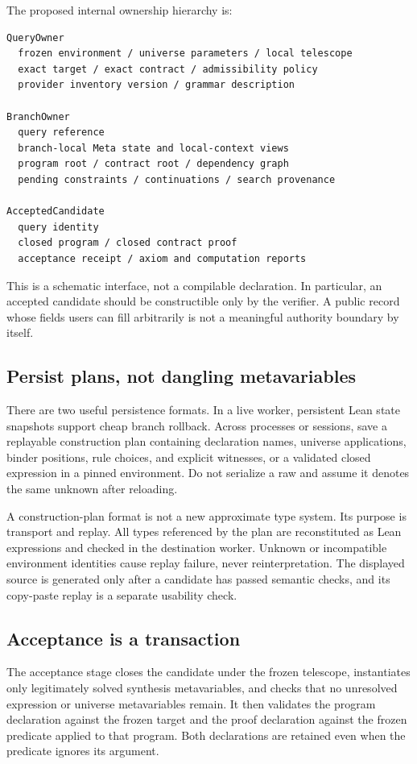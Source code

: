 The proposed internal ownership hierarchy is:
\begin{lstlisting}
QueryOwner
  frozen environment / universe parameters / local telescope
  exact target / exact contract / admissibility policy
  provider inventory version / grammar description

BranchOwner
  query reference
  branch-local Meta state and local-context views
  program root / contract root / dependency graph
  pending constraints / continuations / search provenance

AcceptedCandidate
  query identity
  closed program / closed contract proof
  acceptance receipt / axiom and computation reports
\end{lstlisting}
This is a schematic interface, not a compilable declaration. In particular, an accepted candidate should be constructible only by the verifier. A public record whose fields users can fill arbitrarily is not a meaningful authority boundary by itself.

\subsection{Persist plans, not dangling metavariables}
There are two useful persistence formats. In a live worker, persistent Lean state snapshots support cheap branch rollback. Across processes or sessions, save a replayable construction plan containing declaration names, universe applications, binder positions, rule choices, and explicit witnesses, or a validated closed expression in a pinned environment. Do not serialize a raw  and assume it denotes the same unknown after reloading.

A construction-plan format is not a new approximate type system. Its purpose is transport and replay. All types referenced by the plan are reconstituted as Lean expressions and checked in the destination worker. Unknown or incompatible environment identities cause replay failure, never reinterpretation. The displayed source is generated only after a candidate has passed semantic checks, and its copy-paste replay is a separate usability check.

\subsection{Acceptance is a transaction}
The acceptance stage closes the candidate under the frozen telescope, instantiates only legitimately solved synthesis metavariables, and checks that no unresolved expression or universe metavariables remain. It then validates the program declaration against the frozen target and the proof declaration against the frozen predicate applied to that program. Both declarations are retained even when the predicate ignores its argument.

